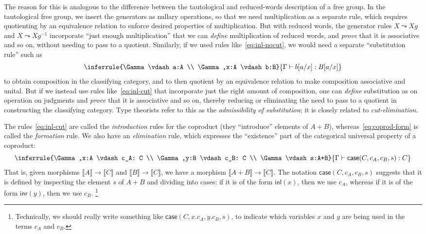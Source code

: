 \documentclass[10pt]{article}
\def\m#1{\llbracket#1\rrbracket}
\def\inl{\mathsf{inl}}
\def\inr{\mathsf{inr}}
\def\case{\mathsf{case}}
\def\types{\vdash}
\numberwithin{equation}{section}
\begin{document}
The reason for this is analogous to the difference between the tautological and reduced-words description of a free group.
In the tautological free group, we insert the generators as nullary operations, so that we need multiplication as a separate rule, which requires quotienting by an equivalence relation to enforce desired properties of multiplication.
But with reduced words, the generator rules $X \leadsto Xg$ and $X \leadsto Xg^{-1}$ incorporate ``just enough multiplication'' that we can \emph{define} multiplication of reduced words, and \emph{prove} that it is associative and so on, without needing to pass to a quotient.
Similarly, if we used rules like~\eqref{eq:inl-nocut}, we would need a separate ``substitution rule'' such as
\[ \inferrule{\Gamma \types a:A \\ \Gamma,x:A \types b:B}{\Gamma \types b[a/x]:B[a/x]} \]
to obtain composition in the classifying category, and to then quotient by an equivalence relation to make composition associative and unital.
But if we instead use rules like~\eqref{eq:inl-cut} that incorporate just the right amount of composition, one can \emph{define} substitution as on operation on judgments and \emph{prove} that it is associative and so on, thereby reducing or eliminating the need to pass to a quotient in constructing the classifying category.
Type theorists refer to this as the \emph{admissibility of substitution}; it is closely related to \emph{cut-elimination}.

The rules~\eqref{eq:inl-cut} are called the \emph{introduction} rules for the coproduct (they ``introduce'' elements of $A+B$), whereas~\eqref{eq:coprod-form} is called the \emph{formation} rule.
We also have an \emph{elimination} rule, which expresses the ``existence'' part of the categorical universal property of a coproduct:
\begin{equation}
  \inferrule{\Gamma,x:A \types c_A: C \\ \Gamma,y:B \types c_B: C \\ \Gamma \types s:A+B}
{\Gamma \types \case(C,c_A,c_B,s) : C}\label{eq:coprod-nondepelim}
\end{equation}
That is, given morphisms $\m A \to \m C$ and $\m B \to \m C$, we have a morphism $\m {A+B} \to \m C$.
The notation $\case(C,c_A,c_B,s)$ suggests that it is defined by inspecting the element $s$ of $A+B$ and dividing into cases: if it is of the form $\inl(x)$, then we use $c_A$, whereas if it is of the form $\inr(y)$, then we use $c_B$.%
\footnote{Technically, we should really write something like $\case(C,x.c_A,y.c_B,s)$, to indicate which variables $x$ and $y$ are being used in the terms $c_A$ and $c_B$.}
\end{document}
